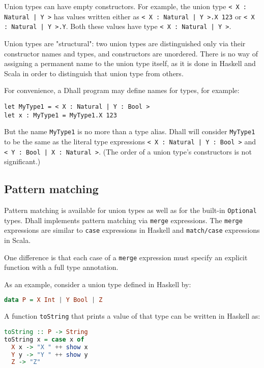 Union types can have empty constructors.
For example, the union type \lstinline!< X : Natural | Y >! has values written either as \lstinline!< X : Natural | Y >.X 123! or \lstinline!< X : Natural | Y >.Y!.
Both these values have type \lstinline!< X : Natural | Y >!.


Union types are "structural": two union types are distinguished only via their constructor names and types, and constructors are unordered.
There is no way of assigning a permanent name to the union type itself, as it is done in Haskell and Scala in order to distinguish that union type from others.


For convenience, a Dhall program may define names for types, for example:


\begin{lstlisting}[language=Dhall]
let MyType1 = < X : Natural | Y : Bool >
let x : MyType1 = MyType1.X 123
\end{lstlisting}


But the name \lstinline!MyType1! is no more than a type alias.
Dhall will consider \lstinline!MyType1! to be the same as the literal type expressions \lstinline!< X : Natural | Y : Bool >! and \lstinline!< Y : Bool | X : Natural >!.
(The order of a union type's constructors is not significant.) 


\subsection{Pattern matching}


Pattern matching is available for union types as well as for the built-in \lstinline!Optional! types.
Dhall implements pattern matching via \lstinline!merge! expressions.
The \lstinline!merge! expressions are similar to \lstinline!case! expressions in Haskell and \lstinline!match/case! expressions in Scala.


One difference is that each case of a \lstinline!merge! expression must specify an explicit function with a full type annotation.


As an example, consider a union type defined in Haskell by:


\begin{lstlisting}[language=Haskell]
data P = X Int | Y Bool | Z
\end{lstlisting}


A function \lstinline!toString! that prints a value of that type can be written in Haskell as:


\begin{lstlisting}[language=Haskell]
toString :: P -> String
toString x = case x of
  X x -> "X " ++ show x
  Y y -> "Y " ++ show y
  Z -> "Z"
\end{lstlisting}


